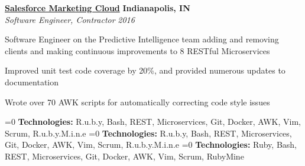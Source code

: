 %
    \headerrow
        {\textbf{\href{https://www.marketingcloud.com/}{Salesforce Marketing Cloud}}}
        {\textbf{Indianapolis, IN}}
    \\
    \headerrow
        {\emph{Software Engineer, Contractor}}
        {\emph{2016}}
    \begin{itemize*}
        \item Software Engineer on the Predictive Intelligence team adding and removing clients
            and making continuous improvements to 8 RESTful Microservices
        \item Improved unit test code coverage by 20\%, and provided numerous updates to documentation
        \item Wrote over 70 AWK scripts for automatically correcting code style issues
    \end{itemize*}

    \ifnum{}=0
        \hspace{1.0em}
        {\textbf{Technologies:} R.u.b.y, Bash, REST, Microservices, Git, Docker, AWK, Vim, Scrum, R.u.b.y.M.i.n.e}
    \fi
    \ifnum{}=0
        \hspace{1.0em}
        {\textbf{Technologies:} R.u.b.y, Bash, REST, Microservices, Git, Docker, AWK, Vim, Scrum, R.u.b.y.M.i.n.e}
    \fi
    \ifnum{}=0
        \hspace{1.0em}
        {\textbf{Technologies:} Ruby, Bash, REST, Microservices, Git, Docker, AWK, Vim, Scrum, RubyMine}
    \fi
